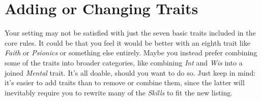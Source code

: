 \section{Adding or Changing Traits}
Your setting may not be satisfied with just the seven basic traits included in the core rules.
It could be that you feel it would be better with an eighth trait like \textit{Faith} or \textit{Psionics} or something else entirely.
Maybe you instead prefer combining some of the traits into broader categories, like combining \textit{Int} and \textit{Wis} into a joined \textit{Mental} trait.
It's all doable, should you want to do so.
Just keep in mind: it's easier to add traits than to remove or combine them, since the latter will inevitably require you to rewrite many of the \textit{Skills} to fit the new listing.